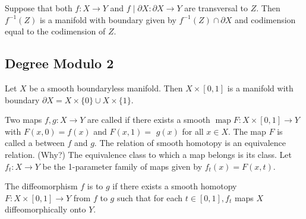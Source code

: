 \documentclass[a4paper, 10pt, twocolumn]{amsart}
\begin{document}
\begin{theorem}
    Suppose that both $f: X \rightarrow Y$ and $f \mid \partial X: \partial X \rightarrow Y$ are transversal to $Z$. Then $f^{-1}(Z)$ is a manifold with boundary given by $f^{-1}(Z) \cap \partial X$ and codimension equal to the codimension of $Z$.
\end{theorem}

\subsection{Degree Modulo 2}

Let $X$ be a smooth boundaryless manifold. Then $X \times[0,1]$ is a manifold with boundary $\partial X=X \times\{0\} \cup X \times\{1\}$.

\begin{definition}
    Two maps $f, g: X \rightarrow Y$ are called  if there exists a smooth $\operatorname{map} F: X \times[0,1] \rightarrow Y$ with $F(x, 0)=f(x)$ and $F(x, 1)=$ $g(x)$ for all $x \in X$. The map $F$ is called a  between $f$ and $g$. The relation of smooth homotopy is an equivalence relation. (Why?) The equivalence class to which a map belongs is its  class. Let $f_{t}: X \rightarrow Y$ be the 1-parameter family of maps given by $f_{t}(x)=F(x, t)$.
\end{definition}

\begin{definition}
    The diffeomorphism $f$ is  to $g$ if there exists a smooth homotopy $F: X \times[0,1] \rightarrow Y$ from $f$ to $g$ such that for each $t \in[0,1], f_{t}$ maps $X$ diffeomorphically onto $Y$.
\end{definition}
\end{document}
